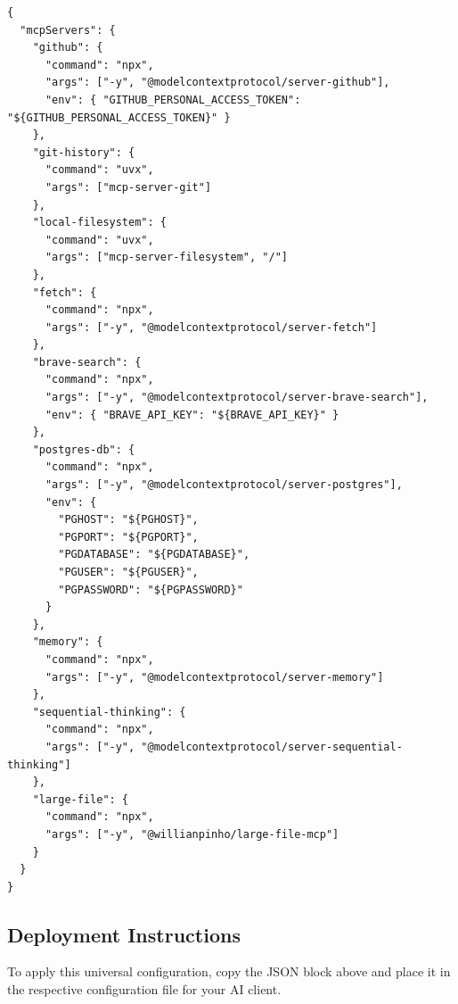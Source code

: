 \begin{lstlisting}[style=json]
{
  "mcpServers": {
    "github": {
      "command": "npx",
      "args": ["-y", "@modelcontextprotocol/server-github"],
      "env": { "GITHUB_PERSONAL_ACCESS_TOKEN": "${GITHUB_PERSONAL_ACCESS_TOKEN}" }
    },
    "git-history": {
      "command": "uvx",
      "args": ["mcp-server-git"]
    },
    "local-filesystem": {
      "command": "uvx",
      "args": ["mcp-server-filesystem", "/"]
    },
    "fetch": {
      "command": "npx",
      "args": ["-y", "@modelcontextprotocol/server-fetch"]
    },
    "brave-search": {
      "command": "npx",
      "args": ["-y", "@modelcontextprotocol/server-brave-search"],
      "env": { "BRAVE_API_KEY": "${BRAVE_API_KEY}" }
    },
    "postgres-db": {
      "command": "npx",
      "args": ["-y", "@modelcontextprotocol/server-postgres"],
      "env": {
        "PGHOST": "${PGHOST}",
        "PGPORT": "${PGPORT}",
        "PGDATABASE": "${PGDATABASE}",
        "PGUSER": "${PGUSER}",
        "PGPASSWORD": "${PGPASSWORD}"
      }
    },
    "memory": {
      "command": "npx",
      "args": ["-y", "@modelcontextprotocol/server-memory"]
    },
    "sequential-thinking": {
      "command": "npx",
      "args": ["-y", "@modelcontextprotocol/server-sequential-thinking"]
    },
    "large-file": {
      "command": "npx",
      "args": ["-y", "@willianpinho/large-file-mcp"]
    }
  }
}
\end{lstlisting}

\subsection{Deployment Instructions}
To apply this universal configuration, copy the JSON block above and place it in the respective configuration file for your AI client.

